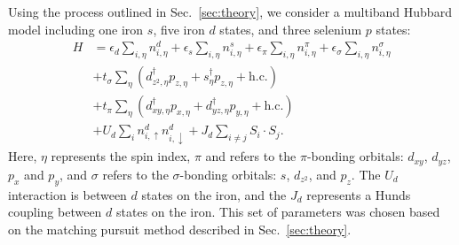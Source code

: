 Using the process outlined in Sec.~\ref{sec:theory}, we consider a multiband Hubbard model including one iron $s$, five iron $d$ states, and three selenium $p$ states:
\begin{align*}
  H 
  &=
  \epsilon_d \sum_{i,\eta} n^{d}_{i,\eta} 
  +
  \epsilon_s \sum_{i,\eta} n^{s}_{i,\eta} 
  +
  \epsilon_\pi \sum_{i,\eta} n^{\pi}_{i,\eta} 
  +
  \epsilon_\sigma \sum_{i,\eta} n^{\sigma}_{i,\eta} 
  \\
  &+ 
  t_{\sigma} \sum_{\eta} \left( d_{z^2,\eta}^{\dagger} p_{z,\eta} + s_{\eta}^{\dagger}  p_{z,\eta} + \text{h.c.} \right)
  \\
  &+ 
  t_{\pi} \sum_{\eta} \left( d_{xy,\eta}^{\dagger} p_{x,\eta} + d_{yz,\eta}^{\dagger}  p_{y,\eta} + \text{h.c.} \right)
  \\
  &+
  U_d \sum_{i} n^{d}_{i,\uparrow} n^{d}_{i,\downarrow} 
  +
  J_d \sum_{i\ne j} S_i \cdot S_j.
\end{align*}
Here, $\eta$ represents the spin index, $\pi$ and refers to the $\pi$-bonding orbitals: $d_{xy}$, $d_{yz}$, $p_x$ and $p_y$, and $\sigma$ refers to the $\sigma$-bonding orbitals: $s$, $d_{z^2}$, and $p_z$. 
The $U_d$ interaction is between $d$ states on the iron, and the $J_d$ represents a Hunds coupling between $d$ states on the iron.
This set of parameters was chosen based on the matching pursuit method described in Sec.~\ref{sec:theory}.
%
%

